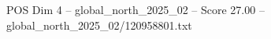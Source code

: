 \begin{textsample}{POS Dim 4 – global\_north\_2025\_02 – Score 27.00 – global\_north\_2025\_02/120958801.txt}
\end{textsample}
